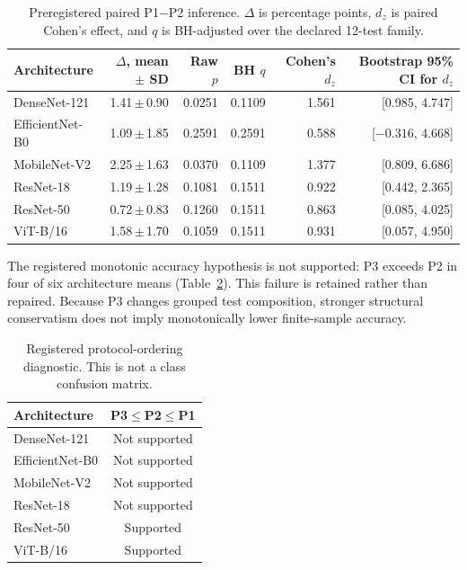 \documentclass[conference]{IEEEtran}
\newcommand{\meanpm}[2]{#1\,$\pm$\,#2}
\newcommand{\protocol}[1]{\textsf{#1}}
\begin{document}
\begin{table}[t]
\caption{Preregistered paired \protocol{P1}$-$\protocol{P2} inference. $\Delta$ is percentage points, $d_z$ is paired Cohen's effect, and $q$ is BH-adjusted over the declared 12-test family.}
\label{tab:inference}
\centering
\scriptsize
\setlength{\tabcolsep}{7.0pt}
\begin{tabular}{lrrrrr}
\toprule
Architecture & $\Delta$, mean $\pm$ SD & Raw $p$ & BH $q$ & Cohen's $d_z$ & Bootstrap 95\% CI for $d_z$ \\
\midrule
DenseNet-121 & \meanpm{1.41}{0.90} & 0.0251 & 0.1109 & 1.561 & [0.985, 4.747] \\
EfficientNet-B0 & \meanpm{1.09}{1.85} & 0.2591 & 0.2591 & 0.588 & [$-0.316$, 4.668] \\
MobileNet-V2 & \meanpm{2.25}{1.63} & 0.0370 & 0.1109 & 1.377 & [0.809, 6.686] \\
ResNet-18 & \meanpm{1.19}{1.28} & 0.1081 & 0.1511 & 0.922 & [0.442, 2.365] \\
ResNet-50 & \meanpm{0.72}{0.83} & 0.1260 & 0.1511 & 0.863 & [0.085, 4.025] \\
ViT-B/16 & \meanpm{1.58}{1.70} & 0.1059 & 0.1511 & 0.931 & [0.057, 4.950] \\
\bottomrule
\end{tabular}
\end{table}

The registered monotonic accuracy hypothesis is not supported: \protocol{P3} exceeds \protocol{P2} in four of six architecture means (Table~\ref{tab:ordering}).
This failure is retained rather than repaired.
Because \protocol{P3} changes grouped test composition, stronger structural conservatism does not imply monotonically lower finite-sample accuracy.

\begin{table}[t]
\caption{Registered protocol-ordering diagnostic. This is not a class confusion matrix.}
\label{tab:ordering}
\centering
\scriptsize
\begin{tabular}{lc}
\toprule
Architecture & \protocol{P3}$\leq$\protocol{P2}$\leq$\protocol{P1} \\
\midrule
DenseNet-121 & Not supported \\
EfficientNet-B0 & Not supported \\
MobileNet-V2 & Not supported \\
ResNet-18 & Not supported \\
ResNet-50 & Supported \\
ViT-B/16 & Supported \\
\bottomrule
\end{tabular}
\end{table}
\end{document}
